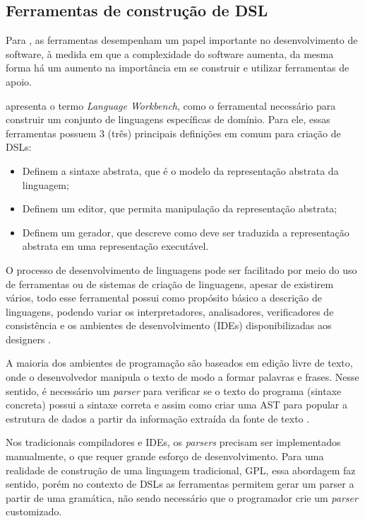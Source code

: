 \newpage
\subsection{Ferramentas de construção de DSL}
\label{ferramentasdsl}

Para , as ferramentas desempenham um papel importante no desenvolvimento de software, à medida em que a complexidade do software aumenta, da mesma forma há um aumento na importância em se construir e utilizar ferramentas de apoio.

 apresenta o termo \textit{Language Workbench}, como o ferramental necessário para construir um conjunto de linguagens específicas de domínio. Para ele, essas ferramentas possuem 3 (três) principais definições em comum para criação de \gls{DSL}s:

\begin{itemize}
    \item Definem a sintaxe abstrata, que é o modelo da representação abstrata da linguagem;
    \item Definem um editor, que permita manipulação da representação abstrata;
    \item Definem um gerador, que descreve como deve ser traduzida a representação abstrata em uma representação executável.
\end{itemize}

O processo de desenvolvimento de linguagens pode ser facilitado por meio do uso de ferramentas ou de sistemas de criação de linguagens, apesar de existirem vários, todo esse ferramental possui como propósito básico a descrição de linguagens, podendo variar os interpretadores, analisadores, verificadores de consistência e os ambientes de desenvolvimento (\gls{IDE}s) disponibilizadas aos designers \cite{mernik2005and}. 

\begin{citacao}


A maioria dos ambientes de programação são baseados em edição livre de texto, onde o desenvolvedor manipula o texto de modo a formar palavras e frases. Nesse sentido, é necessário um \textit{parser} para verificar se o texto do programa (sintaxe concreta) possui a sintaxe correta e assim como criar uma \gls{AST} para popular a estrutura de dados a partir da informação extraída da fonte de texto  \cite{dslengineering}.

\end{citacao}


Nos tradicionais compiladores e \gls{IDE}s, os \textit{parsers} precisam ser implementados manualmente, o que requer grande esforço de desenvolvimento. Para uma realidade de construção de uma linguagem tradicional, \gls{GPL}, essa abordagem faz sentido, porém no contexto de \gls{DSL}s as ferramentas permitem gerar um parser a partir de uma gramática, não sendo necessário que o programador crie um \textit{parser} customizado.

